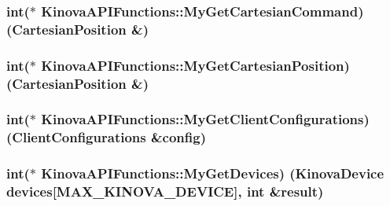 \subsubsection[{\texorpdfstring{My\+Get\+Cartesian\+Command}{MyGetCartesianCommand}}]{\setlength{\rightskip}{0pt plus 5cm}int($\ast$ Kinova\+A\+P\+I\+Functions\+::\+My\+Get\+Cartesian\+Command) (Cartesian\+Position \&)}\hypertarget{classKinovaAPIFunctions_a0306932b326f70ea7bca5903ba0a14f6}{}\label{classKinovaAPIFunctions_a0306932b326f70ea7bca5903ba0a14f6}
\subsubsection[{\texorpdfstring{My\+Get\+Cartesian\+Position}{MyGetCartesianPosition}}]{\setlength{\rightskip}{0pt plus 5cm}int($\ast$ Kinova\+A\+P\+I\+Functions\+::\+My\+Get\+Cartesian\+Position) (Cartesian\+Position \&)}\hypertarget{classKinovaAPIFunctions_ad6a222c864c2f8005093a038138660cc}{}\label{classKinovaAPIFunctions_ad6a222c864c2f8005093a038138660cc}
\subsubsection[{\texorpdfstring{My\+Get\+Client\+Configurations}{MyGetClientConfigurations}}]{\setlength{\rightskip}{0pt plus 5cm}int($\ast$ Kinova\+A\+P\+I\+Functions\+::\+My\+Get\+Client\+Configurations) (Client\+Configurations \&config)}\hypertarget{classKinovaAPIFunctions_a6963b06d9d1a59c04465bda48ff2a5ab}{}\label{classKinovaAPIFunctions_a6963b06d9d1a59c04465bda48ff2a5ab}
\subsubsection[{\texorpdfstring{My\+Get\+Devices}{MyGetDevices}}]{\setlength{\rightskip}{0pt plus 5cm}int($\ast$ Kinova\+A\+P\+I\+Functions\+::\+My\+Get\+Devices) (Kinova\+Device devices\mbox{[}M\+A\+X\+\_\+\+K\+I\+N\+O\+V\+A\+\_\+\+D\+E\+V\+I\+CE\mbox{]}, int \&result)}\hypertarget{classKinovaAPIFunctions_a8d0313599ab0d35b7de11113e17b90f2}{}\label{classKinovaAPIFunctions_a8d0313599ab0d35b7de11113e17b90f2}
